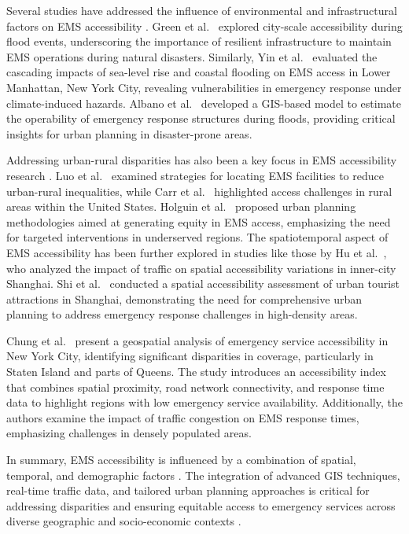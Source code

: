 Several studies have addressed the influence of environmental and infrastructural factors on EMS accessibility \cite{chen2021self,you2021knowledge,ma2022stingy}. Green et al.~\cite{green2017city} explored city-scale accessibility during flood events, underscoring the importance of resilient infrastructure to maintain EMS operations during natural disasters. Similarly, Yin et al.~\cite{yin2017evaluating} evaluated the cascading impacts of sea-level rise and coastal flooding on EMS access in Lower Manhattan, New York City, revealing vulnerabilities in emergency response under climate-induced hazards. Albano et al.~\cite{albano2014gis} developed a GIS-based model to estimate the operability of emergency response structures during floods, providing critical insights for urban planning in disaster-prone areas.

Addressing urban-rural disparities has also been a key focus in EMS accessibility research \cite{you2022class,you2022end,you2022simcvd}. Luo et al.~\cite{luo2022locating} examined strategies for locating EMS facilities to reduce urban-rural inequalities, while Carr et al.~\cite{carr2009access} highlighted access challenges in rural areas within the United States. Holguin et al.~\cite{holguin2018access} proposed urban planning methodologies aimed at generating equity in EMS access, emphasizing the need for targeted interventions in underserved regions. The spatiotemporal aspect of EMS accessibility has been further explored in studies like those by Hu et al.~\cite{hu2020impact}, who analyzed the impact of traffic on spatial accessibility variations in inner-city Shanghai. Shi et al.~\cite{shi2022spatial} conducted a spatial accessibility assessment of urban tourist attractions in Shanghai, demonstrating the need for comprehensive urban planning to address emergency response challenges in high-density areas.

Chung et al.~\cite{chung2024access} present a geospatial analysis of emergency service accessibility in New York City, identifying significant disparities in coverage, particularly in Staten Island and parts of Queens. The study introduces an accessibility index that combines spatial proximity, road network connectivity, and response time data to highlight regions with low emergency service availability. Additionally, the authors examine the impact of traffic congestion on EMS response times, emphasizing challenges in densely populated areas.

In summary, EMS accessibility is influenced by a combination of spatial, temporal, and demographic factors \cite{han2023medgen3d,cai2023cross,zeng2023fast,you2023implicit}. The integration of advanced GIS techniques, real-time traffic data, and tailored urban planning approaches is critical for addressing disparities and ensuring equitable access to emergency services across diverse geographic and socio-economic contexts \cite{ma2023pre,you2023actionplus}.
